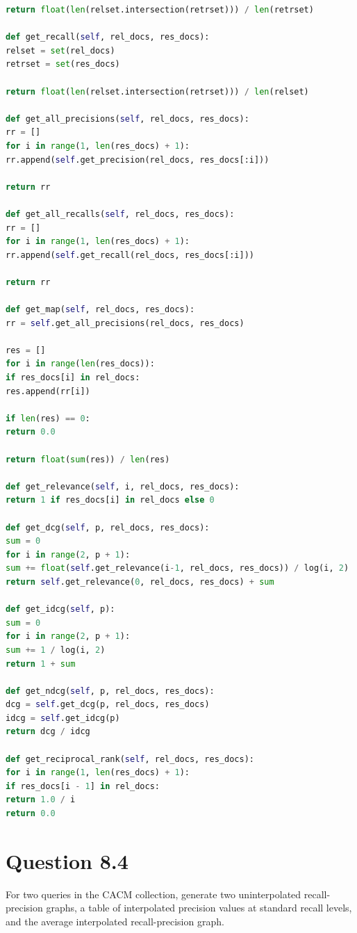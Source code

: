 \documentclass[letterpaper,11pt]{article}
\begin{document}
\begin{lstlisting}[language=python, caption={Code for galago.py}, label={lst:galago.py}]
return float(len(relset.intersection(retrset))) / len(retrset)

def get_recall(self, rel_docs, res_docs):
relset = set(rel_docs)
retrset = set(res_docs)

return float(len(relset.intersection(retrset))) / len(relset)

def get_all_precisions(self, rel_docs, res_docs):
rr = []
for i in range(1, len(res_docs) + 1):
rr.append(self.get_precision(rel_docs, res_docs[:i]))

return rr

def get_all_recalls(self, rel_docs, res_docs):
rr = []
for i in range(1, len(res_docs) + 1):
rr.append(self.get_recall(rel_docs, res_docs[:i]))

return rr

def get_map(self, rel_docs, res_docs):
rr = self.get_all_precisions(rel_docs, res_docs)

res = []
for i in range(len(res_docs)):
if res_docs[i] in rel_docs:
res.append(rr[i])

if len(res) == 0:
return 0.0

return float(sum(res)) / len(res)

def get_relevance(self, i, rel_docs, res_docs):
return 1 if res_docs[i] in rel_docs else 0

def get_dcg(self, p, rel_docs, res_docs):
sum = 0
for i in range(2, p + 1):
sum += float(self.get_relevance(i-1, rel_docs, res_docs)) / log(i, 2)
return self.get_relevance(0, rel_docs, res_docs) + sum

def get_idcg(self, p):
sum = 0
for i in range(2, p + 1):
sum += 1 / log(i, 2)
return 1 + sum

def get_ndcg(self, p, rel_docs, res_docs):
dcg = self.get_dcg(p, rel_docs, res_docs)
idcg = self.get_idcg(p)
return dcg / idcg

def get_reciprocal_rank(self, rel_docs, res_docs):
for i in range(1, len(res_docs) + 1):
if res_docs[i - 1] in rel_docs:
return 1.0 / i
return 0.0

\end{lstlisting}



\noindent\makebox[\linewidth]{\rule{\textwidth}{0.4pt}}

\section*{Question 8.4}
\begin{spverbatim}
For two queries in the CACM collection, generate two uninterpolated recall-precision graphs, a table of interpolated precision values at standard recall levels, and the average
interpolated recall-precision graph. 
\end{spverbatim}
\end{document}
